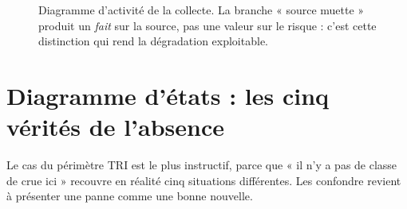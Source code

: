 \begin{figure}[h]
{
}
\caption{Diagramme d'activité de la collecte. La branche « source muette »
produit un \emph{fait} sur la source, pas une valeur sur le risque : c'est cette
distinction qui rend la dégradation exploitable.}
\label{fig:activite}
\end{figure}

\section{Diagramme d'états : les cinq vérités de l'absence}
\label{sec:etats-tri}

Le cas du périmètre TRI est le plus instructif, parce que « il n'y a pas de
classe de crue ici » recouvre en réalité cinq situations différentes. Les
confondre revient à présenter une panne comme une bonne nouvelle.

